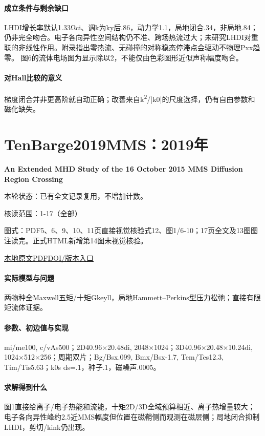 \paragraph{成立条件与剩余缺口}LHDI增长率默认1.33Ωci、调k为ky后.86，动力学1.1，局地闭合.34，非局地.84；仍非完全吻合。电子各向异性空间结构仍不准、跨场热流过大；未研究LHDI对重联的非线性作用。附录指出零热流、无碰撞的对称稳态停滞点会驱动不物理Pxx趋零。 图6的流体电场图为显示除以2，不能仅由色彩图形近似声称幅度吻合。

\paragraph{对Hall比较的意义}梯度闭合并非更高阶就自动正确；改善来自k\textsuperscript{2}/|k0|的尺度选择，仍有自由参数和磁化缺失。

\section{TenBarge2019MMS：2019年}\label{paper:TenBarge2019MMS}

\textbf{An Extended MHD Study of the 16 October 2015 MMS Diffusion Region Crossing}\citep{TenBarge2019MMS}

\textsf{本轮状态：}已有全文记录复用，不增加计数。

\textsf{核读范围：}1-17（全部）\par\textsf{图式：}PDF5、6、9、10、11页直接视觉核验式12、图1/6-10；17页全文及13图图注读完。正式HTML新增第14图未视觉核验。

\href{run:../../papers/TenBarge2019MMS.pdf}{本地原文PDF}\quad\href{https://doi.org/10.1029/2019JA026731}{DOI/版本入口}

\paragraph{实际模型与问题}两物种全Maxwell五矩/十矩Gkeyll，局地Hammett–Perkins型压力松弛；直接有限矩流体证据。

\paragraph{参数、初边值与实现}mi/me100, c/vAs500；2D40.96×20.48di, 2048×1024；3D40.96×20.48×10.24di, 1024×512×256；周期双片；Bg/Bsx.099, Bmx/Bsx-1.7, Tem/Tes12.3, Tim/Tis5.63；k0s ds=.1，种子.1，磁噪声.0005。

\paragraph{求解得到什么}图1直接给离子/电子热能和流能，十矩2D/3D全域预算相近、离子热增量较大；电子各向异性峰约2.5近MMS幅度但位置在磁鞘侧而观测在磁层侧；局地闭合抑制LHDI，剪切/kink仍出现。

